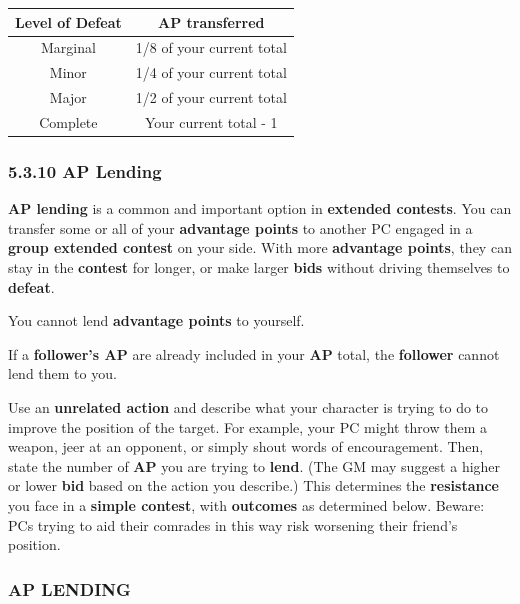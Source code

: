 \documentclass[
]{article}
\begin{document}
\begin{longtable}[]{@{}cc@{}}
\toprule
Level of Defeat & AP transferred\tabularnewline
\midrule
\endhead
Marginal & 1/8 of your current total\tabularnewline
Minor & 1/4 of your current total\tabularnewline
Major & 1/2 of your current total\tabularnewline
Complete & Your current total - 1\tabularnewline
\bottomrule
\end{longtable}

\hypertarget{ap-lending}{%
\subsubsection{5.3.10 AP Lending}\label{ap-lending}}

\textbf{AP lending} is a common and important option in \textbf{extended
contests}. You can transfer some or all of your \textbf{advantage
points} to another PC engaged in a \textbf{group extended contest} on
your side. With more \textbf{advantage points}, they can stay in the
\textbf{contest} for longer, or make larger \textbf{bids} without
driving themselves to \textbf{defeat}.

You cannot lend \textbf{advantage points} to yourself.

If a \textbf{follower's AP} are already included in your \textbf{AP}
total, the \textbf{follower} cannot lend them to you.

Use an \textbf{unrelated action} and describe what your character is
trying to do to improve the position of the target. For example, your PC
might throw them a weapon, jeer at an opponent, or simply shout words of
encouragement. Then, state the number of \textbf{AP} you are trying to
\textbf{lend}. (The GM may suggest a higher or lower \textbf{bid} based
on the action you describe.) This determines the \textbf{resistance} you
face in a \textbf{simple contest}, with \textbf{outcomes} as determined
below. Beware: PCs trying to aid their comrades in this way risk
worsening their friend's position.

\hypertarget{ap-lending-1}{%
\subsubsection{AP LENDING}\label{ap-lending-1}}
\end{document}
